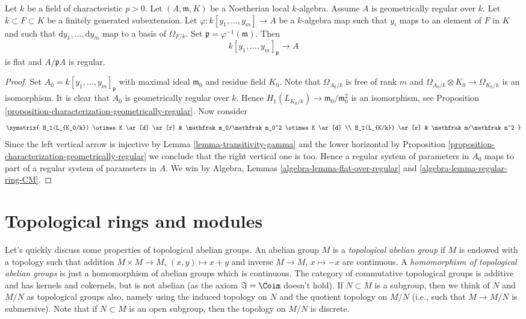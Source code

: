 \begin{lemma}
\label{lemma-geometrically-regular-over-field}
Let $k$ be a field of characteristic $p > 0$. Let $(A, \mathfrak m, K)$
be a Noetherian local $k$-algebra. Assume $A$ is geometrically regular
over $k$. Let $k \subset F \subset K$ be a finitely generated subextension.
Let $\varphi : k[y_1, \ldots, y_m] \to A$ be a $k$-algebra map
such that $y_i$ maps to an element of $F$ in $K$ and such that
$\text{d}y_1, \ldots, \text{d}y_m$ map to a basis of $\Omega_{F/k}$.
Set $\mathfrak p = \varphi^{-1}(\mathfrak m)$. Then
$$
k[y_1, \ldots, y_m]_\mathfrak p \to A
$$
is flat and $A/\mathfrak pA$ is regular.
\end{lemma}

\begin{proof}
Set $A_0 = k[y_1, \ldots, y_m]_\mathfrak p$ with maximal ideal
$\mathfrak m_0$ and residue field $K_0$. Note that
$\Omega_{A_0/k}$ is free of rank $m$ and
$\Omega_{A_0/k} \otimes K_0 \to \Omega_{K_0/k}$ is an isomorphism.
It is clear that $A_0$ is geometrically regular over $k$. Hence
$H_1(L_{K_0/k}) \to \mathfrak m_0/\mathfrak m_0^2$ is an isomorphism, see
Proposition \ref{proposition-characterization-geometrically-regular}.
Now consider
$$
\xymatrix{
H_1(L_{K_0/k}) \otimes K \ar[d] \ar[r] &
\mathfrak m_0/\mathfrak m_0^2 \otimes K \ar[d] \\
H_1(L_{K/k}) \ar[r] & \mathfrak m/\mathfrak m^2
}
$$
Since the left vertical arrow is injective by
Lemma \ref{lemma-transitivity-gamma}
and the lower horizontal by
Proposition \ref{proposition-characterization-geometrically-regular}
we conclude that the right vertical one is too.
Hence a regular system of parameters in $A_0$ maps to
part of a regular system of parameters in $A$.
We win by
Algebra, Lemmas \ref{algebra-lemma-flat-over-regular} and
\ref{algebra-lemma-regular-ring-CM}.
\end{proof}












\section{Topological rings and modules}
\label{section-topological-ring}

\noindent
Let's quickly discuss some properties of topological abelian groups.
An abelian group $M$ is a {\it topological abelian group} if $M$ is
endowed with a topology such that addition $M \times M \to M$,
$(x, y) \mapsto x + y$ and inverse $M \to M$, $x \mapsto -x$ are
continuous. A {\it homomorphism of topological abelian groups}
is just a homomorphism of abelian groups which is continuous.
The category of commutative topological groups is additive and
has kernels and cokernels, but is not abelian (as the axiom
$\Im = \Coim$ doesn't hold). If $N \subset M$ is a
subgroup, then we think of $N$ and $M/N$ as topological groups
also, namely using the induced topology on $N$ and the quotient
topology on $M/N$ (i.e., such that $M \to M/N$ is submersive).
Note that if $N \subset M$ is an open subgroup, then the topology
on $M/N$ is discrete.

